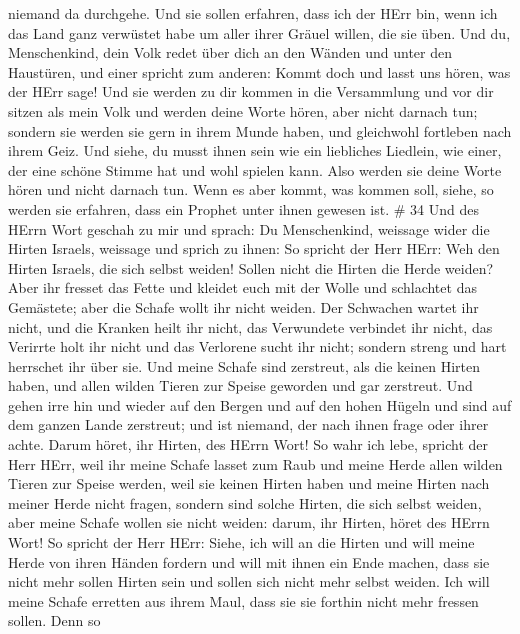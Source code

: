 niemand da durchgehe.  Und sie sollen erfahren, dass ich
der HErr bin, wenn ich das Land ganz verwüstet habe um aller ihrer
Gräuel willen, die sie üben.  Und du, Menschenkind, dein
Volk redet über dich an den Wänden und unter den Haustüren, und einer
spricht zum anderen: Kommt doch und lasst uns hören, was der HErr sage!
 Und sie werden zu dir kommen in die Versammlung und vor
dir sitzen als mein Volk und werden deine Worte hören, aber nicht
darnach tun; sondern sie werden sie gern in ihrem Munde haben, und
gleichwohl fortleben nach ihrem Geiz.  Und siehe, du musst
ihnen sein wie ein liebliches Liedlein, wie einer, der eine schöne
Stimme hat und wohl spielen kann. Also werden sie deine Worte hören und
nicht darnach tun.  Wenn es aber kommt, was kommen soll,
siehe, so werden sie erfahren, dass ein Prophet unter ihnen gewesen ist.
\# 34  Und des HErrn Wort geschah zu mir und sprach:
 Du Menschenkind, weissage wider die Hirten Israels,
weissage und sprich zu ihnen: So spricht der Herr HErr: Weh den Hirten
Israels, die sich selbst weiden! Sollen nicht die Hirten die Herde
weiden?  Aber ihr fresset das Fette und kleidet euch mit der
Wolle und schlachtet das Gemästete; aber die Schafe wollt ihr nicht
weiden.  Der Schwachen wartet ihr nicht, und die Kranken
heilt ihr nicht, das Verwundete verbindet ihr nicht, das Verirrte holt
ihr nicht und das Verlorene sucht ihr nicht; sondern streng und hart
herrschet ihr über sie.  Und meine Schafe sind zerstreut,
als die keinen Hirten haben, und allen wilden Tieren zur Speise geworden
und gar zerstreut.  Und gehen irre hin und wieder auf den
Bergen und auf den hohen Hügeln und sind auf dem ganzen Lande zerstreut;
und ist niemand, der nach ihnen frage oder ihrer achte. 
Darum höret, ihr Hirten, des HErrn Wort!  So wahr ich lebe,
spricht der Herr HErr, weil ihr meine Schafe lasset zum Raub und meine
Herde allen wilden Tieren zur Speise werden, weil sie keinen Hirten
haben und meine Hirten nach meiner Herde nicht fragen, sondern sind
solche Hirten, die sich selbst weiden, aber meine Schafe wollen sie
nicht weiden:  darum, ihr Hirten, höret des HErrn Wort!
 So spricht der Herr HErr: Siehe, ich will an die Hirten
und will meine Herde von ihren Händen fordern und will mit ihnen ein
Ende machen, dass sie nicht mehr sollen Hirten sein und sollen sich
nicht mehr selbst weiden. Ich will meine Schafe erretten aus ihrem Maul,
dass sie sie forthin nicht mehr fressen sollen.  Denn so
